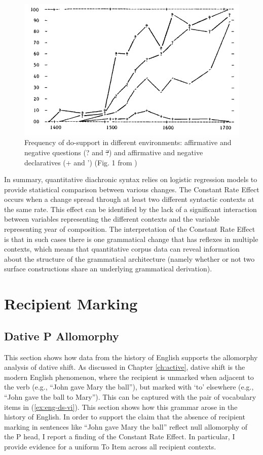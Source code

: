 	\begin{figure}[ht!]
		\includegraphics[width=.5\linewidth]{../images/kroch-graph}
		\caption{Frequency of do-support in different environments: affirmative and negative questions (? and \sout{?}) and affirmative and negative declaratives (+ and ') (Fig. 1 from \citealt{Kroch.1989})}
		\label{fig:kroch-graph}
	\end{figure}

	In summary, quantitative diachronic syntax relies on logistic regression models to provide statistical comparison between various changes. The Constant Rate Effect occurs when a change spread through at least two different syntactic contexts at the same rate. This effect can be identified by the lack of a significant interaction between variables representing the different contexts and the variable representing year of composition. The interpretation of the Constant Rate Effect is that in such cases there is one grammatical change that has reflexes in multiple contexts, which means that quantitative corpus data can reveal information about the structure of the grammatical architecture (namely whether or not two surface constructions share an underlying grammatical derivation).

\section{Recipient Marking}
\subsection{Dative P Allomorphy}
This section shows how data from the history of English supports the allomorphy analysis of dative shift. As discussed in Chapter \ref{ch:active}, dative shift is the modern English phenomenon, where the recipient is unmarked when adjacent to the verb (e.g., ``John gave Mary the ball''), but marked with `to' elsewhere (e.g., ``John gave the ball to Mary''). This can be captured with the pair of vocabulary items in (\ref{ex:eng-ds-vi}). This section shows how this grammar arose in the history of English. In order to support the claim that the absence of recipient marking in sentences like ``John gave Mary the ball'' reflect null allomorphy of the P head, I report a finding of the Constant Rate Effect. In particular, I provide evidence for a uniform To Item across all recipient contexts.  

